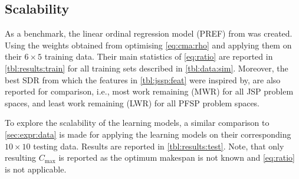 \documentclass[graybox]{svmult}
\begin{document}
\subsection{Scalability}\label{sec:expr:scalability} 
As a benchmark, the linear ordinal regression model (PREF) from \cite{InRu11a} 
was created.
Using the weights obtained from optimising \cref{eq:cma:rho} and applying them 
on their  $6\times5$ training data. Their main statistics of \cref{eq:ratio} 
are reported in \cref{tbl:results:train} for all training sets described in 
\cref{tbl:data:sim}. Moreover, the best SDR from which the features in 
\cref{tbl:jssp:feat} were inspired by, are also reported for comparison, i.e., 
most work remaining (MWR) for all JSP problem spaces, and least work remaining 
(LWR) for all PFSP problem spaces.

To explore the scalability of the learning models, a similar comparison to 
\cref{sec:expr:data} is made for applying the learning models on their 
corresponding $10\times10$ testing data. Results are reported in 
\cref{tbl:results:test}. Note, that only resulting $C_{\max}$ is reported as 
the optimum makespan is not known and \cref{eq:ratio} is not applicable. 
\end{document}
